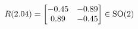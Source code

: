 \documentclass[preview]{standalone}
\begin{document}
\begin{align*}
\special{dvisvgm:raw <g id='unique000'>}R(2.04) = \begin{bmatrix} -0.45 & -0.89 \\ 0.89 & -0.45 \end{bmatrix} \in \text{SO}(2)\special{dvisvgm:raw </g>}
\end{align*}
\end{document}
